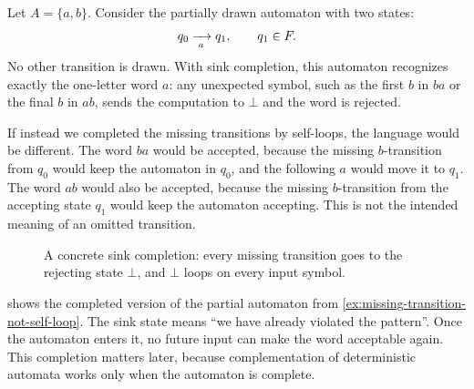 \begin{example}
\label{ex:missing-transition-not-self-loop}
Let $A=\{a,b\}$.  Consider the partially drawn automaton with two
states:
\[
  q_0 \xrightarrow[{\;a\;}]{} q_1,
  \qquad
  q_1\in F.
\]
No other transition is drawn.  With sink completion, this automaton
recognizes exactly the one-letter word $a$: any unexpected symbol, such
as the first $b$ in $ba$ or the final $b$ in $ab$, sends the computation
to $\bot$ and the word is rejected.

If instead we completed the missing transitions by self-loops, the
language would be different.  The word $ba$ would be accepted, because
the missing $b$-transition from $q_0$ would keep the automaton in $q_0$,
and the following $a$ would move it to $q_1$.  The word $ab$ would also
be accepted, because the missing $b$-transition from the accepting state
$q_1$ would keep the automaton accepting.  This is not the intended
meaning of an omitted transition.
\end{example}

\begin{figure}[ht]
\centering
{}
\caption{A concrete sink completion: every missing transition goes to the rejecting state $\bot$, and $\bot$ loops on every input symbol.}
\label{fig:concrete-sink-completion}
\end{figure}

 shows the completed version of the
partial automaton from \cref{ex:missing-transition-not-self-loop}.  The
sink state means ``we have already violated the pattern''.  Once the
automaton enters it, no future input can make the word acceptable again.
This completion matters later, because complementation of deterministic
automata works only when the automaton is complete.


